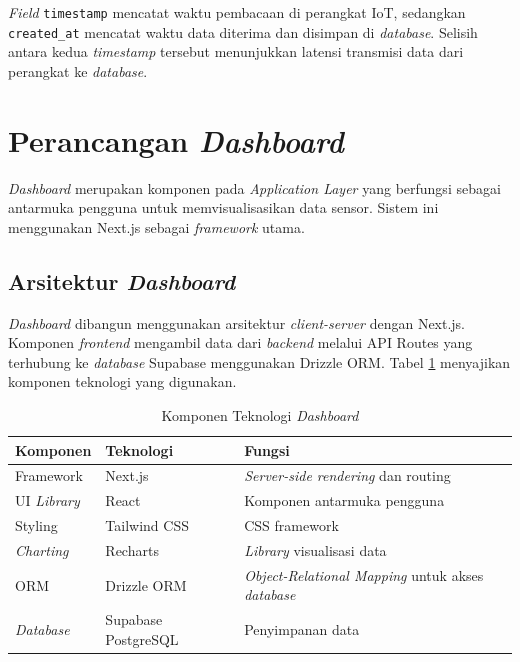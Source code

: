 \textit{Field} \texttt{timestamp} mencatat waktu pembacaan di perangkat IoT, sedangkan \texttt{created\_at} mencatat waktu data diterima dan disimpan di \textit{database}. Selisih antara kedua \textit{timestamp} tersebut menunjukkan latensi transmisi data dari perangkat ke \textit{database}.

\section{Perancangan \textit{Dashboard}}
\label{sec:perancangan-dashboard}

\textit{Dashboard} merupakan komponen pada \textit{Application Layer} yang berfungsi sebagai antarmuka pengguna untuk memvisualisasikan data sensor. Sistem ini menggunakan Next.js sebagai \textit{framework} utama.

\subsection{Arsitektur \textit{Dashboard}}

\textit{Dashboard} dibangun menggunakan arsitektur \textit{client-server} dengan Next.js. Komponen \textit{frontend} mengambil data dari \textit{backend} melalui API Routes yang terhubung ke \textit{database} Supabase menggunakan Drizzle ORM. Tabel \ref{tab:teknologi-dashboard} menyajikan komponen teknologi yang digunakan.

\begin{table}[H]
  \caption{Komponen Teknologi \textit{Dashboard}}
  \label{tab:teknologi-dashboard}
  \begin{tabularx}{\textwidth}{| l | l | X |}
    \hline
    \textbf{Komponen} & \textbf{Teknologi} & \textbf{Fungsi} \\
    \hline
    Framework & Next.js & \textit{Server-side rendering} dan routing \\
    \hline
    UI \textit{Library} & React & Komponen antarmuka pengguna \\
    \hline
    Styling & Tailwind CSS & CSS framework \\
    \hline
    \textit{Charting} & Recharts & \textit{Library} visualisasi data \\
    \hline
    ORM & Drizzle ORM & \textit{Object-Relational Mapping} untuk akses \textit{database} \\
    \hline
    \textit{Database} & Supabase PostgreSQL & Penyimpanan data \\
    \hline
  \end{tabularx}
\end{table}

